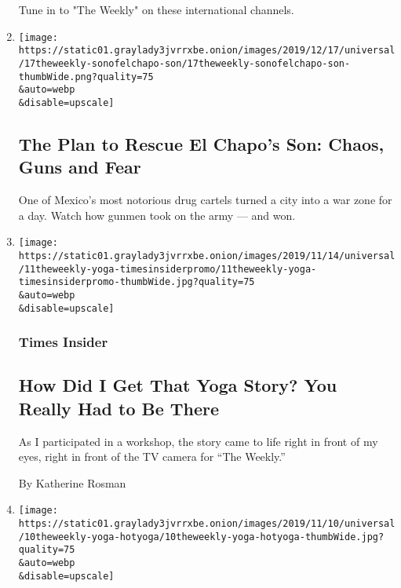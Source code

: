 \begin{enumerate}
  Tune in to "The Weekly" on these international channels.~
\item
  \href{/2019/11/15/the-weekly/el-chapo-guzman-son.html}{}

  \texttt{[image: https://static01.graylady3jvrrxbe.onion/images/2019/12/17/universal/17theweekly-sonofelchapo-son/17theweekly-sonofelchapo-son-thumbWide.png?quality=75\\\&auto=webp\\\&disable=upscale]}

  \hypertarget{the-plan-to-rescue-el-chapos-son-chaos-guns-and-fear}{%
  \subsection{The Plan to Rescue El Chapo's Son: Chaos, Guns and
  Fear}\label{the-plan-to-rescue-el-chapos-son-chaos-guns-and-fear}}

  One of Mexico's most notorious drug cartels turned a city into a war
  zone for a day. Watch how gunmen took on the army --- and won.
\item
  \href{/2019/11/11/reader-center/yoga-touch-reporting.html}{}

  \texttt{[image: https://static01.graylady3jvrrxbe.onion/images/2019/11/14/universal/11theweekly-yoga-timesinsiderpromo/11theweekly-yoga-timesinsiderpromo-thumbWide.jpg?quality=75\\\&auto=webp\\\&disable=upscale]}

  \hypertarget{times-insider}{%
  \subsubsection{Times Insider}\label{times-insider}}

  \hypertarget{how-did-i-get-that-yoga-story-you-really-had-to-be-there}{%
  \subsection{How Did I Get That Yoga Story? You Really Had to Be
  There}\label{how-did-i-get-that-yoga-story-you-really-had-to-be-there}}

  As I participated in a workshop, the story came to life right in front
  of my eyes, right in front of the TV camera for ``The Weekly.''

  By Katherine Rosman
\item
  \href{/2019/11/08/the-weekly/yoga-consent-touch.html}{}

  \texttt{[image: https://static01.graylady3jvrrxbe.onion/images/2019/11/10/universal/10theweekly-yoga-hotyoga/10theweekly-yoga-hotyoga-thumbWide.jpg?quality=75\\\&auto=webp\\\&disable=upscale]}


\end{enumerate}
